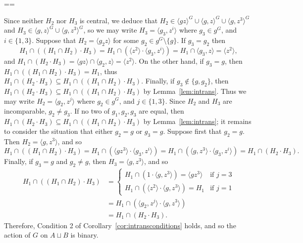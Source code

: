 \documentclass[11pt, a4paper]{amsart}
\makeatletter
\renewcommand{\proofname}{Proof}
\renewenvironment{proof}[1][\proofname]{\par
  \pushQED{\qed}  \normalfont \partopsep=\z@skip \topsep=\z@skip
  \trivlist
  \item[\hskip\labelsep
        \scshape
    #1\@addpunct{.}]\ignorespaces
}{  \popQED\endtrivlist\@endpefalse
}
\makeatother
\begin{document}
\begin{proof}
    Since neither $H_2$ nor $H_3$ is central, we deduce that $H_2\in \langle gz\rangle^G\cup\langle g,z\rangle^G\cup\langle g,z^3\rangle ^G$ and $H_3\in\langle g,z\rangle^G\cup\langle g,z^3\rangle^G$, so we may write $H_3=\langle g_3,z^i\rangle$ where $g_3\in g^G$, and $i\in\{1,3\}$. Suppose that $H_2=\langle g_2z\rangle$ for some $g_2\in g^G\setminus\{g\}$. If $g_3=g_2$ then $$H_1\cap((H_1\cap H_2)\cdot H_3)=H_1\cap(\langle z^2\rangle \cdot \langle g_3,z^i\rangle)=H_1\cap\langle g_3,z\rangle=
        \langle z^2\rangle,
    $$
    and $H_1\cap (H_2\cdot H_3)=\langle gz\rangle\cap\langle g_2,z\rangle=\langle z^2\rangle$. On the other hand, if $g_3=g$, then $H_1\cap((H_1\cap H_2)\cdot H_3)=H_1$, thus $H_1\cap (H_2\cdot H_3)\subseteq H_1\cap((H_1\cap H_2)\cdot H_3)$. Finally, if $g_3\not\in\{g,g_2\}$, then $H_1\cap (H_2\cdot H_3)\subseteq H_1\cap((H_1\cap H_2)\cdot H_3)$ by Lemma~\ref{lem:intrans}. Thus we may write $H_2=\langle g_2,z^j\rangle$ where $g_2\in g^G$, and $j\in\{1,3\}$. Since $H_2$ and $H_3$ are incomparable, $g_2\ne g_3$. If no two of $g_1,g_2,g_3$ are equal, then $H_1\cap (H_2\cdot H_3)\subseteq H_1\cap((H_1\cap H_2)\cdot H_3)$ by Lemma~\ref{lem:intrans}; it remains to consider the situation that either $g_2=g$ or $g_3=g$. Suppose first that $g_2=g$. Then $H_2=\langle g,z^3\rangle$, and so $$H_1\cap((H_1\cap H_2)\cdot H_3)=H_1\cap (\langle gz^3\rangle\cdot\langle g_3,z^i\rangle)=H_1\cap (\langle g,z^3\rangle\cdot\langle g_3,z^i\rangle)=H_1\cap(H_2\cdot H_3).                      $$
    Finally, if $g_3=g$ and $g_2\ne g$, then $H_3=\langle g,z^3\rangle$, and so \begin{align*}
        H_1\cap((H_1\cap H_2)\cdot H_3)&=\begin{cases}
            H_1\cap (1\cdot\langle g,z^3\rangle)=\langle gz^3\rangle&\text{if $j=3$}\\
            H_1\cap(\langle z^2\rangle\cdot \langle g,z^3\rangle)=H_1&\text{if $j=1$}
        \end{cases}\\&=H_1\cap (\langle g_2,z^j\rangle\cdot\langle g,z^3\rangle)\\&=H_1\cap(H_2\cdot H_3).
    \end{align*}                      Therefore, Condition 2 of Corollary~\ref{cor:intransconditions} holds, and so the action of $G$ on $A\sqcup B$ is binary.


\end{proof}
\end{document}
